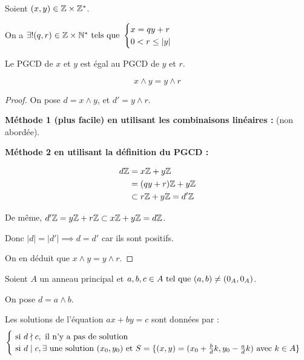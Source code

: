 \documentclass[12pt,a4paper]{report}
\begin{document}
\begin{property}
    Soient $(x,y) \in \mathbb{Z} \times\mathbb{Z}^*$.

    On a $\exists!(q,r)\in\mathbb{Z}\times\mathbb{N}^* \text{ tels que } \begin{cases}
    x=qy+r\\
    0 < r \leq |y|
    \end{cases}$

    Le PGCD de $x$ et $y$ est égal au PGCD de $y$ et $r$.

    $$x\wedge y = y \wedge r$$
\end{property}

\begin{proof}
    On pose $d=x\wedge y$, et $d' = y \wedge r$.

    \textbf{Méthode 1 (plus facile) en utilisant les combinaisons linéaires :} (non abordée).

    \textbf{Méthode 2 en utilisant la définition du PGCD :}

    \begin{align*}
        d\mathbb{Z} &= x\mathbb{Z} + y\mathbb{Z}\\
        &= (qy+r)\mathbb{Z} + y\mathbb{Z}\\
        &\subset r\mathbb{Z} + y\mathbb{Z}=d'\mathbb{Z}\\
    \end{align*}

    De même, $d'\mathbb{Z} = y\mathbb{Z} + r\mathbb{Z} \subset x\mathbb{Z} + y\mathbb{Z} = d\mathbb{Z}$.

    Donc $|d| = |d'| \implies d = d'$ car ils sont positifs.

    On en déduit que $x \wedge y = y \wedge r$.

\end{proof}

\begin{property}[Équation $ax+by=c$]
    Soient $A$ un anneau principal et $a,b,c \in A \text{ tel que } (a,b)\neq (0_A,0_A)$.

    On pose $d = a \wedge b$.

    Les solutions de l'équation $ax + by = c$ sont données par :
    $$\begin{cases}
        \text{ si } d \nmid c, \text{ il n'y a pas de solution}\\
        \text{ si } d \mid c, \exists \text{ une solution }(x_0,y_0) \text{ et } S= \{(x,y) = (x_0 + \frac{b}{d}k, y_0 - \frac{a}{d}k) \text{ avec } k \in A\}
    \end{cases}$$
    
\end{property}
\end{document}
